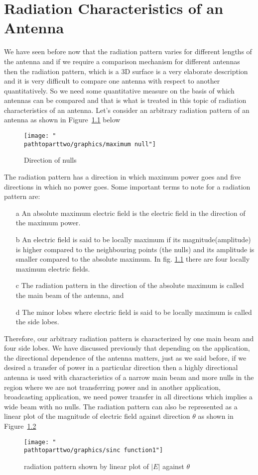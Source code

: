 \chapter{Radiation Characteristics of an Antenna}
We have seen before now that the radiation pattern varies for different lengths of the antenna and if we require a comparison mechanism for different antennas then the radiation pattern, which is a 3D surface is a very elaborate description and it is very difficult to compare one antenna with respect to another quantitatively. So we need some quantitative measure on the basis of which antennas can be compared and that is what is treated in this topic of radiation characteristics of an antenna.
Let's consider an arbitrary radiation pattern of an antenna as shown in Figure~\ref{figure8} below

\begin{figure}[h]
\centering
\texttt{[image: "\\pathtoparttwo/graphics/maximum null"]}
\caption{Direction of nulls}
\label{figure8}
\end{figure}

The radiation pattern has a direction in which maximum power goes and five directions in which no power goes. Some important terms to note for a radiation pattern are:
\begin{enumerate}
\item [a]	An absolute maximum electric field is the electric field in the direction of the maximum power.
\item [b]	An electric field is said to be locally maximum if its magnitude(amplitude) is higher compared to the neighbouring points (the nulls) and its amplitude is smaller compared to the absolute maximum. In fig. \ref{figure8} there are four locally maximum electric fields.
\item [c]	The radiation pattern in the direction of the absolute maximum is called the main beam of the antenna, and
\item [d] 	The minor lobes where electric field is said to be locally maximum is called the side lobes.
\end{enumerate}

Therefore, our arbitrary radiation pattern is characterized by one main beam and four side lobes. We have discussed previously that depending on the application, the directional dependence of the antenna matters, just as we said before, if we desired a transfer of power in a particular direction then a highly directional antenna is used with characteristics of a narrow main beam and more nulls in the region where we are not transferring power and in another application, broadcasting application, we need power transfer in all directions which implies a wide beam with no nulls.
The radiation pattern can also be represented as a linear plot of the magnitude of electric field against direction $\theta$  as shown in Figure~\ref{figure9}
\begin{figure}[h]
\centering
\texttt{[image: "\\pathtoparttwo/graphics/sinc function1"]}
\caption{radiation pattern shown by linear plot of $|E|$ against $\theta$}
\label{figure9}
\end{figure}

